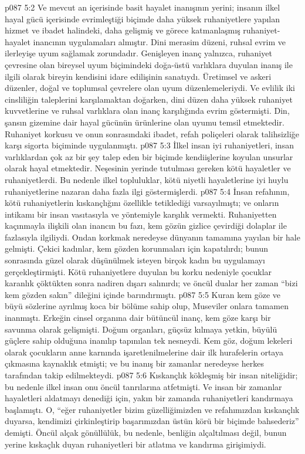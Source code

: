 \vs p087 5:2 Ve mevcut an içerisinde basit hayalet inanışının yerini; insanın ilkel hayal gücü içerisinde evrimleştiği biçimde daha yüksek ruhaniyetlere yapılan hizmet ve ibadet halindeki, daha gelişmiş ve görece katmanlaşmış ruhaniyet\hyp{}hayalet inancının uygulamaları almıştır. Dini merasim düzeni, ruhsal evrim ve ilerleyişe uyum sağlamak zorundadır. Genişleyen inanç yalnızca, ruhaniyet çevresine olan bireysel uyum biçimindeki doğa\hyp{}üstü varlıklara duyulan inanış ile ilgili olarak bireyin kendisini idare edilişinin sanatıydı. Üretimsel ve askeri düzenler, doğal ve toplumsal çevrelere olan uyum düzenlemeleriydi. Ve evlilik iki cinsliliğin taleplerini karşılamaktan doğarken, dini düzen daha yüksek ruhaniyet kuvvetlerine ve ruhsal varlıklara olan inanç karşılığında evrim göstermişti. Din, şansın gizemine dair hayal gücünün ürünlerine olan uyumu temsil etmektedir. Ruhaniyet korkusu ve onun sonrasındaki ibadet, refah poliçeleri olarak talihsizliğe karşı sigorta biçiminde uygulanmıştı.
\vs p087 5:3 İlkel insan iyi ruhaniyetleri, insan varlıklardan çok az bir şey talep eden bir biçimde kendiişlerine koyulan unsurlar olarak hayal etmektedir. Neşesinin yerinde tutulması gereken kötü hayaletler ve ruhaniyetlerdi. Bu nedenle ilkel topluluklar, kötü niyetli hayaletlerine iyi huylu ruhaniyetlerine nazaran daha fazla ilgi göstermişlerdi.
\vs p087 5:4 İnsan refahının, kötü ruhaniyetlerin kıskançlığını özellikle tetiklediği varsayılmıştı; ve onların intikamı bir insan vasıtasıyla ve  yöntemiyle karşılık vermekti. Ruhaniyetten kaçınmayla ilişkili olan inancın bu fazı, kem gözün gizlice çevirdiği dolaplar ile fazlasıyla ilgiliydi. Ondan korkmak neredeyse dünyanın tamamına yayılan bir hale gelmişti. Çekici kadınlar, kem gözden korunmaları için kapatılırdı; bunun sonrasında güzel olarak düşünülmek isteyen birçok kadın bu uygulamayı gerçekleştirmişti. Kötü ruhaniyetlere duyulan bu korku nedeniyle çocuklar karanlık çöktükten sonra nadiren dışarı salınırdı; ve öncül dualar her zaman “bizi kem gözden sakın” dileğini içinde barındırmıştı.
\vs p087 5:5 Kuran kem göze ve büyü sözlerine ayrılmış koca bir bölüme sahip olup, Museviler onlara tamamen inanmıştı. Erkeğin cinsel organına dair bütüncül inanç, kem göze karşı bir savunma olarak gelişmişti. Doğum organları, güçsüz kılmaya yetkin, büyülü güçlere sahip olduğuna inanılıp tapınılan tek nesneydi. Kem göz, doğum lekeleri olarak çocukların anne karnında işaretlenilmelerine dair ilk hurafelerin ortaya çıkmasına kaynaklık etmişti; ve bu inanış bir zamanlar neredeyse herkes tarafından takip edilmekteydi.
\vs p087 5:6 Kıskançlık kökleşmiş bir insan niteliğidir; bu nedenle ilkel insan onu öncül tanrılarına atfetmişti. Ve insan bir zamanlar hayaletleri aldatmayı denediği için, yakın bir zamanda ruhaniyetleri kandırmaya başlamıştı. O, “eğer ruhaniyetler bizim güzelliğimizden ve refahımızdan kıskançlık duyarsa, kendimizi çirkinleştirip başarımızdan üstün körü bir biçimde bahsederiz” demişti. Öncül alçak gönüllülük, bu nedenle, benliğin alçaltılması değil, bunun yerine kıskaçlık duyan ruhaniyetleri bir atlatma ve kandırma girişimiydi.

